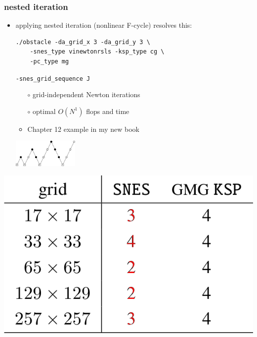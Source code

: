 \documentclass[svgnames,
               hyperref={colorlinks,citecolor=DeepPink4,linkcolor=FireBrick,urlcolor=Maroon},
               usepdftitle=false]  %
               {beamer}
\begin{document}
\begin{frame}[fragile]
\frametitle{nested iteration}

\begin{itemize}
\item applying nested iteration (nonlinear F-cycle) resolves this:

\vspace{2mm}
\begin{Verbatim}[xleftmargin=13mm,fontsize=\scriptsize]
./obstacle -da_grid_x 3 -da_grid_y 3 \
    -snes_type vinewtonrsls -ksp_type cg \
    -pc_type mg
\end{Verbatim}

\vspace{-4.9mm}
\hspace{39mm} {\scriptsize \color{FireBrick} \texttt{-snes\_grid\_sequence J}}

\vspace{2mm}
    \begin{itemize}
    \item[$\circ$] grid-independent Newton iterations
    \item[$\circ$] optimal $O(N^1)$ flops and time
    \item<2>[$\circ$] Chapter 12 example in my new book
    \end{itemize}

\vspace{-12mm}
\hfill \includegraphics[width=0.25\textwidth]{images/mg-fcycle.png}
\end{itemize}

\bigskip
\includegraphics[height=0.25\textheight]{images/vi-newton-gmg-good.png} 


\end{frame}
\end{document}
